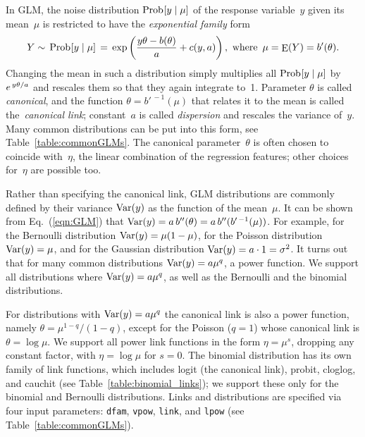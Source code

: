 \smallskip

In GLM, the noise distribution $\mathop{\mathrm{Prob}\hspace{0.5pt}}\nolimits[y\mid \mu]$ of the response variable~$y$
given its mean~$\mu$ is restricted to have the \emph{exponential family} form
\begin{equation}
Y \sim\, \mathop{\mathrm{Prob}\hspace{0.5pt}}\nolimits[y\mid \mu] \,=\, \exp\left(\frac{y\theta - b(\theta)}{a}
+ c(y, a)\right),\,\,\textrm{where}\,\,\,\mu = \mathop{\mathrm{E}}\nolimits(Y) = b'(\theta).
\label{eqn:GLM}
\end{equation}
Changing the mean in such a distribution simply multiplies all \mbox{$\mathop{\mathrm{Prob}\hspace{0.5pt}}\nolimits[y\mid \mu]$}
by~$e^{\,y\hspace{0.2pt}\theta/a}$ and rescales them so that they again integrate to~1.
Parameter $\theta$ is called \emph{canonical}, and the function $\theta = b'^{\,-1}(\mu)$
that relates it to the mean is called the~\emph{canonical link}; constant~$a$ is called
\emph{dispersion} and rescales the variance of~$y$.  Many common distributions can be put
into this form, see Table~\ref{table:commonGLMs}.  The canonical parameter~$\theta$
is often chosen to coincide with~$\eta$, the linear combination of the regression features;
other choices for~$\eta$ are possible too.

Rather than specifying the canonical link, GLM distributions are commonly defined
by their variance $\mathop{\mathrm{Var}}\nolimits(y)$ as the function of the mean~$\mu$.  It can be shown
from Eq.~(\ref{eqn:GLM}) that $\mathop{\mathrm{Var}}\nolimits(y) = a\,b''(\theta) = a\,b''(b'^{\,-1}(\mu))$.
For example, for the Bernoulli distribution $\mathop{\mathrm{Var}}\nolimits(y) = \mu(1-\mu)$, for the Poisson
distribution \mbox{$\mathop{\mathrm{Var}}\nolimits(y) = \mu$}, and for the Gaussian distribution
$\mathop{\mathrm{Var}}\nolimits(y) = a\cdot 1 = \sigma^2$.
It turns out that for many common distributions $\mathop{\mathrm{Var}}\nolimits(y) = a\mu^q$, a power function.
We support all distributions where $\mathop{\mathrm{Var}}\nolimits(y) = a\mu^q$, as well as the Bernoulli and
the binomial distributions.

For distributions with $\mathop{\mathrm{Var}}\nolimits(y) = a\mu^q$ the canonical link is also a power function,
namely $\theta = \mu^{1-q}/(1-q)$, except for the Poisson ($q = 1$) whose canonical link is
$\theta = \log\mu$.  We support all power link functions in the form $\eta = \mu^s$,
dropping any constant factor, with $\eta = \log\mu$ for $s=0$.  The binomial distribution
has its own family of link functions, which includes logit (the canonical link),
probit, cloglog, and cauchit (see Table~\ref{table:binomial_links}); we support these
only for the binomial and Bernoulli distributions.  Links and distributions are specified
via four input parameters: {\tt dfam}, {\tt vpow}, {\tt link}, and {\tt lpow} (see
Table~\ref{table:commonGLMs}).

